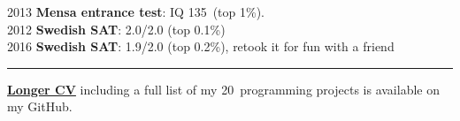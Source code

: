 \documentclass[10pt,letterpaper]{article}
\newenvironment{indentsection}[1]%
{\begin{list}{}%
    {\setlength{\leftmargin}{#1}}%
    \item[]%
}
{\end{list}}
\newcommand{\CPP}
{C\nolinebreak[4]\hspace{-.05em}\raisebox{.22ex}{\footnotesize\bf ++}}
\newcommand{\PLUS}
{\nolinebreak[4]\hspace{-.05em}\raisebox{.22ex}{\footnotesize\bf +}}
\begin{document}
2013 \textbf{Mensa entrance test}: IQ 135\PLUS \ (top 1\%). \\
2012 \textbf{Swedish SAT}: 2.0/2.0 (top 0.1\%) \\
2016 \textbf{Swedish SAT}: 1.9/2.0 (top 0.2\%), retook it for fun with a friend

\vspace{1em}
\hrule
\vspace{1em}

\large{{\href{https://github.com/jakkdl/resume}{\textbf{Longer CV}}}} \normalsize{including a full list of my 20\PLUS \ programming projects is available on my GitHub.}

%
\end{document}

